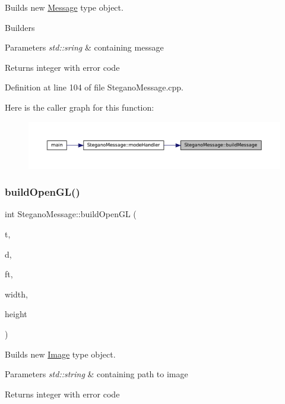 Builds new \mbox{\hyperlink{classMessage}{Message}} type object. 

Builders
\begin{DoxyParams}{Parameters}
{\em std\+::sring} & containing message \\
\hline
\end{DoxyParams}
\begin{DoxyReturn}{Returns}
integer with error code 
\end{DoxyReturn}


Definition at line 104 of file Stegano\+Message.\+cpp.

Here is the caller graph for this function\+:\nopagebreak
\begin{figure}[H]
\begin{center}
\leavevmode
\includegraphics[width=350pt]{classSteganoMessage_a43a7d1579509a4004a86ad70dad10f65_icgraph}
\end{center}
\end{figure}
\mbox{\label{classSteganoMessage_ae7b73b51fe38826625497a3bfef2bf42}} 
\subsubsection{\texorpdfstring{buildOpenGL()}{buildOpenGL()}}
{\footnotesize\ttfamily int Stegano\+Message\+::build\+Open\+GL (\begin{DoxyParamCaption}\item[{std\+::string}]{t,  }\item[{unsigned char $\ast$}]{d,  }\item[{std\+::string}]{ft,  }\item[{int}]{width,  }\item[{int}]{height }\end{DoxyParamCaption})}



Builds new \mbox{\hyperlink{classImage}{Image}} type object. 


\begin{DoxyParams}{Parameters}
{\em std\+::string} & containing path to image \\
\hline
\end{DoxyParams}
\begin{DoxyReturn}{Returns}
integer with error code 
\end{DoxyReturn}


